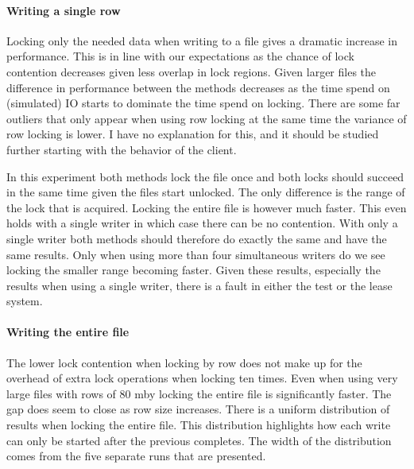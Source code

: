 \paragraph{Writing a single row}
Locking only the needed data when writing to a file gives a dramatic increase in performance. This is in line with our expectations as the chance of lock contention decreases given less overlap in lock regions. Given larger files the difference in performance between the methods decreases as the time spend on (simulated) IO starts to dominate the time spend on locking. There are some far outliers that only appear when using row locking at the same time the variance of row locking is lower. I have no explanation for this, and it should be studied further starting with the behavior of the client.

In this experiment both methods lock the file once and both locks should succeed in the same time given the files start unlocked. The only difference is the range of the lock that is acquired. Locking the entire file is however much faster. This even holds with a single writer in which case there can be no contention. With only a single writer both methods should therefore do exactly the same and have the same results. Only when using more than four simultaneous writers do we see locking the smaller range becoming faster. Given these results, especially the results when using a single writer, there is a fault in either the test or the lease system.
%
\paragraph{Writing the entire file}
The lower lock contention when locking by row does not make up for the overhead of extra lock operations when locking ten times. Even when using very large files with rows of 80 \ac{mby} locking the entire file is significantly faster. The gap does seem to close as row size increases. There is a uniform distribution of results when locking the entire file. This distribution highlights how each write can only be started after the previous completes. The width of the distribution comes from the five separate runs that are presented.
